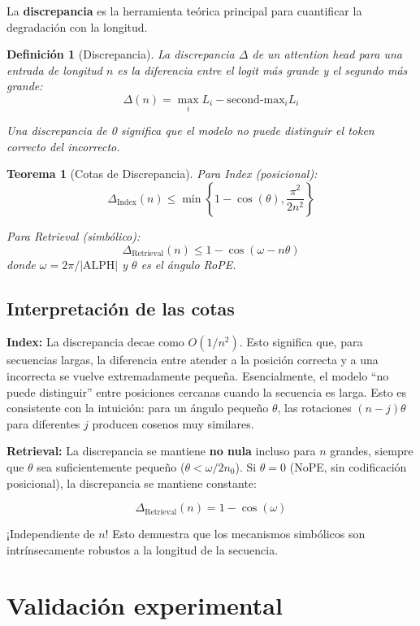 \documentclass[12pt,a4paper,oneside]{report}
\newtheorem{theorem}{Teorema}[chapter]
\newtheorem{definition}{Definición}[chapter]
\begin{document}
La \textbf{discrepancia} es la herramienta teórica principal para cuantificar la degradación con la longitud.

\begin{definition}[Discrepancia]
La discrepancia $\Delta$ de un attention head para una entrada de longitud $n$ es la diferencia entre el logit más grande y el segundo más grande:
\[
\Delta(n) = \max_i L_i - \text{second-max}_i L_i
\]

Una discrepancia de 0 significa que el modelo no puede distinguir el token correcto del incorrecto.
\end{definition}

\begin{theorem}[Cotas de Discrepancia]
Para Index (posicional):
\[
\Delta_{\text{Index}}(n) \leq \min\left\{1 - \cos(\theta), \frac{\pi^2}{2n^2}\right\}
\]

Para Retrieval (simbólico):
\[
\Delta_{\text{Retrieval}}(n) \leq 1 - \cos(\omega - n\theta)
\]
donde $\omega = 2\pi/|\text{ALPH}|$ y $\theta$ es el ángulo RoPE.
\end{theorem}

\subsection{Interpretación de las cotas}

\textbf{Index:} La discrepancia decae como $O(1/n^2)$. Esto significa que, para secuencias largas, la diferencia entre atender a la posición correcta y a una incorrecta se vuelve extremadamente pequeña. Esencialmente, el modelo ``no puede distinguir'' entre posiciones cercanas cuando la secuencia es larga. Esto es consistente con la intuición: para un ángulo pequeño $\theta$, las rotaciones $(n-j)\theta$ para diferentes $j$ producen cosenos muy similares.

\textbf{Retrieval:} La discrepancia se mantiene \textbf{no nula} incluso para $n$ grandes, siempre que $\theta$ sea suficientemente pequeño ($\theta < \omega/2n_0$). Si $\theta = 0$ (NoPE, sin codificación posicional), la discrepancia se mantiene constante:

\[
\Delta_{\text{Retrieval}}(n) = 1 - \cos(\omega)
\]

¡Independiente de $n$! Esto demuestra que los mecanismos simbólicos son intrínsecamente robustos a la longitud de la secuencia.

\section{Validación experimental}
\end{document}
